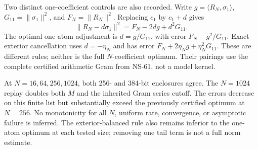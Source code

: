 Two distinct one-coefficient controls are also recorded. Write
$g=\langle R_N,\sigma_1\rangle$, $G_{11}=\|\sigma_1\|^2$, and
$F_N=\|R_N\|^2$. Replacing $c_1$ by $c_1+d$ gives
\[
 \|R_N-d\sigma_1\|^2=F_N-2dg+d^2G_{11}.
\]
The optimal one-atom adjustment is $d=g/G_{11}$, with error
$F_N-g^2/G_{11}$. Exact exterior cancellation uses $d=-\eta_N$ and
has error $F_N+2\eta_Ng+\eta_N^2G_{11}$. These are different rules;
neither is the full $N$-coefficient optimum. Their pairings use the
complete certified arithmetic Gram from NS-61, not a model kernel.

At $N=16,64,256,1024$, both 256- and 384-bit enclosures agree. The
$N=1024$ replay doubles both $M$ and the inherited Gram series cutoff.
The errors decrease on this finite list but substantially exceed the
previously certified optimum at $N=256$. No monotonicity for all $N$,
uniform rate, convergence, or asymptotic failure is inferred. The
exterior-balanced rule also remains inferior to the one-atom optimum
at each tested size; removing one tail term is not a full norm estimate.

